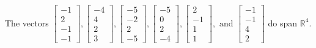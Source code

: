 \begin{exercise}
\begin{exerciseStatement}
  \end{exerciseStatement}
  \begin{exerciseAnswer}
   The vectors \(\left[\begin{array}{r}
-1 \\
2 \\
-1 \\
-1
\end{array}\right] , \left[\begin{array}{r}
-4 \\
4 \\
2 \\
3
\end{array}\right] , \left[\begin{array}{r}
-5 \\
-2 \\
2 \\
-5
\end{array}\right] , \left[\begin{array}{r}
-5 \\
0 \\
2 \\
-4
\end{array}\right] , \left[\begin{array}{r}
2 \\
-1 \\
1 \\
1
\end{array}\right] , \text{ and } \left[\begin{array}{r}
-1 \\
-1 \\
4 \\
2
\end{array}\right]\) 
  	 do  
	span \(\mathbb{R}^4\).
  


  \end{exerciseAnswer}
\end{exercise}